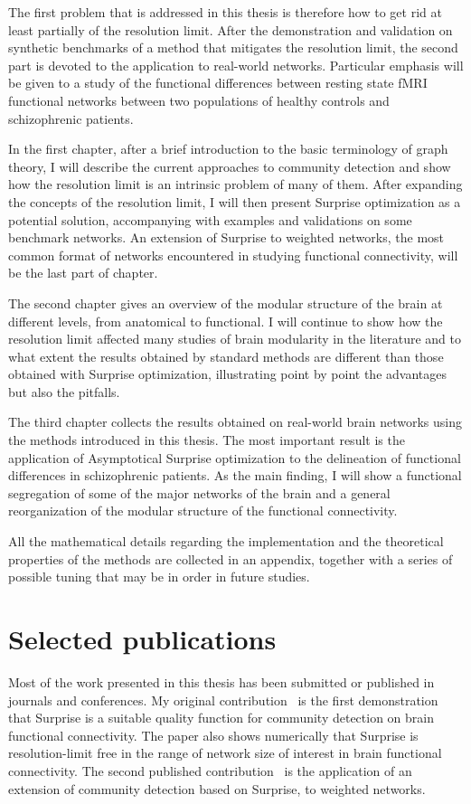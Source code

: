 {\color{red}The first problem that is addressed in this thesis is therefore how to get rid at least partially of the resolution limit. 
After the demonstration and validation on synthetic benchmarks of a method that mitigates the resolution limit, the second part is devoted to the application to real-world networks. Particular emphasis will be given to a study of the functional differences between resting state fMRI functional networks between two populations of healthy controls and schizophrenic patients. 

In the first chapter, after a brief introduction to the basic terminology of graph theory, I will describe the current approaches to community detection and show how the resolution limit is an intrinsic problem of many of them. After expanding the concepts of the resolution limit, I will then present Surprise optimization as a potential solution, accompanying with examples and validations on some benchmark networks. An extension of Surprise to weighted networks, the most common format of networks encountered in studying functional connectivity, will be the last part of chapter.

The second chapter gives an overview of the modular structure of the brain at different levels, from anatomical to functional. I will continue to show how the resolution limit affected many studies of brain modularity in the literature and to what extent the results obtained by standard methods are different than those obtained with Surprise optimization, illustrating point by point the advantages but also the pitfalls.

The third chapter collects the results obtained on real-world brain networks using the methods introduced in this thesis. The most important result is the application of Asymptotical Surprise optimization to the delineation of functional differences in schizophrenic patients. As the main finding, I will show a functional segregation of some of the major networks of the brain and a general reorganization of the modular structure of the functional connectivity.

All the mathematical details regarding the implementation and the theoretical properties of the methods are collected in an appendix, together with a series of possible tuning that may be in order in future studies.}

\section*{Selected publications}
Most of the work presented in this thesis has been submitted or published in journals and conferences. My original contribution~\cite{nicolini2016} is the first demonstration that Surprise is a suitable quality function for community detection on brain functional connectivity.
The paper also shows numerically that Surprise is resolution-limit free in the range of network size of interest in brain functional connectivity.
The second published contribution~\cite{nicolini2017} is the application of an extension of community detection based on Surprise, to weighted networks.